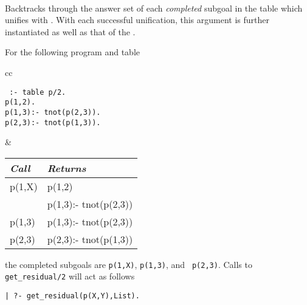 \begin{description}
\begin{minipage}{6.1in}
\end{minipage} \\


%
Backtracks through the answer set of each \emph{completed} subgoal in
the table which unifies with .  With each successful
unification, this argument is further instantiated as well as that of
the .

\begin{example}
For the following program and table
     \begin{center}
     \begin{tabular}{cc}
     \begin{minipage}{2.1in}
     {\tt
          :- table p/2.	\\
	  p(1,2). \\
	  p(1,3):- tnot(p(2,3)). \\
	  p(2,3):- tnot(p(1,3)). 
     }
     \end{minipage}
     &
     \begin{tabular}{||l|l||}   \hline
     {\em Call}			& {\em Returns} \\ \hline \hline
     p(1,X)			& p(1,2) \\ 
 	       			& p(1,3):- tnot(p(2,3)) \\ \hline
     p(1,3)			& p(1,3):- tnot(p(2,3)) \\ \hline
     p(2,3)			& p(2,3):- tnot(p(1,3)) \\ \hline
     \end{tabular}
     \end{tabular}
     \end{center}
the completed subgoals are {\tt p(1,X)}, {\tt p(1,3)}, and {\tt
p(2,3)}.  Calls to {\tt get\_residual/2} will act as follows
%
\begin{center}
\begin{small}
\begin{minipage}{2.5in}
\begin{verbatim} 
| ?- get_residual(p(X,Y),List).


\end{verbatim}
\end{minipage}
\end{small}
\end{center}
\end{example}
\end{description}

